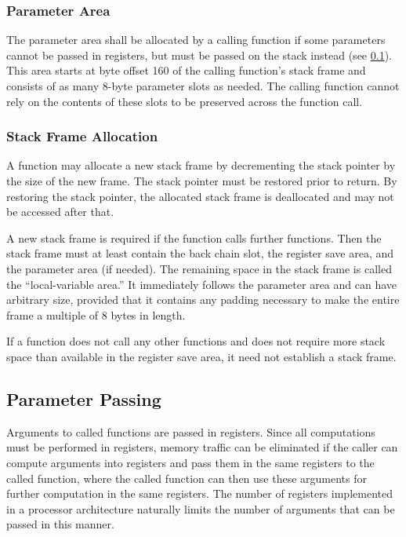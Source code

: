 \documentclass[english,11pt,twoside,toc=bib,toc=idx]{scrreprt}
\newcommand{\NBYTES}{8}
\newcommand{\STACKSIZE}{160}
\newcommand{\NBYTES}{4}
\newcommand{\STACKSIZE}{96}
\begin{document}
\subsubsection{Parameter Area}
The parameter area shall be allocated by a calling function if some
parameters cannot be passed in registers, but must be passed on the stack
instead (see \cref{parameterpassing}).  This area starts at byte offset
\STACKSIZE{} of the calling function's stack frame and consists of as many
\NBYTES{}-byte parameter slots as needed.  The calling function cannot
rely on the contents of these slots to be preserved across the function
call.

\subsubsection{Stack Frame Allocation}
A function may allocate a new stack frame by decrementing the stack
pointer by the size of the new frame.  The stack pointer must be restored
prior to return.  By restoring the stack pointer, the allocated stack
frame is deallocated and may not be accessed after that.

A new stack frame is required if the function calls further functions.
Then the stack frame must at least contain the back chain slot, the
register save area, and the parameter area (if needed).  The remaining
space in the stack frame is called the ``local-variable area.''  It
immediately follows the parameter area and can have arbitrary size,
provided that it contains any padding necessary to make the entire frame a
multiple of 8 bytes in length.

If a function does not call any other functions and does not require more
stack space than available in the register save area, it need not
establish a stack frame.

\subsection{Parameter Passing}
\label{parameterpassing}
Arguments to called functions are passed in registers.  Since all
computations must be performed in registers, memory traffic can be
eliminated if the caller can compute arguments into registers and pass
them in the same registers to the called function, where the called
function can then use these arguments for further computation in the
same registers.  The number of registers implemented in a processor
architecture naturally limits the number of arguments that can be
passed in this manner.
\end{document}

